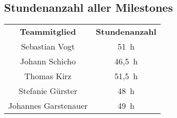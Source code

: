 \begin{landscape}
	\subsection{Stundenanzahl aller Milestones}
	\begin{center}
		\begin{tabular}{ c c }
			\textbf{Teammitglied} & \textbf{Stundenanzahl} \\
			Sebastian Vogt & 51~h\\
			Johann Schicho & 46,5~h\\
			Thomas Kirz & 51,5~h\\
			Stefanie Gürster & 48~h\\
			Johannes Garstenauer & 49~h
		\end{tabular}
	\end{center}
\end{landscape}
